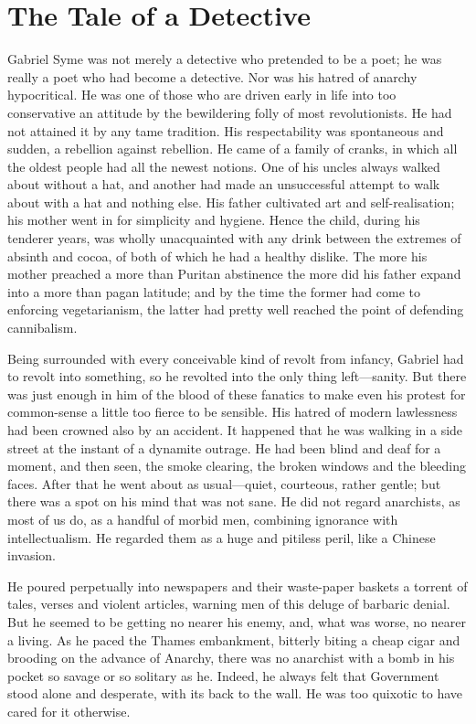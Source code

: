 \documentclass{book}
\begin{document}
\chapter{The Tale of a Detective}
\label{chapter-3}
Gabriel Syme was not merely a detective who pretended to be a poet; he was really a poet who had become a detective. Nor was his hatred of anarchy hypocritical. He was one of those who are driven early in life into too conservative an attitude by the bewildering folly of most revolutionists. He had not attained it by any tame tradition. His respectability was spontaneous and sudden, a rebellion against rebellion. He came of a family of cranks, in which all the oldest people had all the newest notions. One of his uncles always walked about without a hat, and another had made an unsuccessful attempt to walk about with a hat and nothing else. His father cultivated art and self-realisation; his mother went in for simplicity and hygiene. Hence the child, during his tenderer years, was wholly unacquainted with any drink between the extremes of absinth and cocoa, of both of which he had a healthy dislike. The more his mother preached a more than Puritan abstinence the more did his father expand into a more than pagan latitude; and by the time the former had come to enforcing vegetarianism, the latter had pretty well reached the point of defending cannibalism.

Being surrounded with every conceivable kind of revolt from infancy, Gabriel had to revolt into something, so he revolted into the only thing left—sanity. But there was just enough in him of the blood of these fanatics to make even his protest for common-sense a little too fierce to be sensible. His hatred of modern lawlessness had been crowned also by an accident. It happened that he was walking in a side street at the instant of a dynamite outrage. He had been blind and deaf for a moment, and then seen, the smoke clearing, the broken windows and the bleeding faces. After that he went about as usual—quiet, courteous, rather gentle; but there was a spot on his mind that was not sane. He did not regard anarchists, as most of us do, as a handful of morbid men, combining ignorance with intellectualism. He regarded them as a huge and pitiless peril, like a Chinese invasion.

He poured perpetually into newspapers and their waste-paper baskets a torrent of tales, verses and violent articles, warning men of this deluge of barbaric denial. But he seemed to be getting no nearer his enemy, and, what was worse, no nearer a living. As he paced the Thames embankment, bitterly biting a cheap cigar and brooding on the advance of Anarchy, there was no anarchist with a bomb in his pocket so savage or so solitary as he. Indeed, he always felt that Government stood alone and desperate, with its back to the wall. He was too quixotic to have cared for it otherwise.
\end{document}
